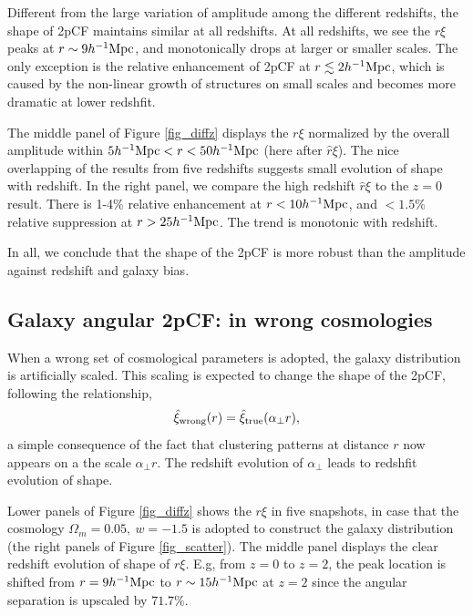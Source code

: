 \documentclass[iop]{emulateapj}
\begin{document}
Different from the large variation of amplitude among the different redshifts, %
the shape of 2pCF maintains similar at all redshifts. 
At all redshifts, we see the $r\xi$ peaks at $r\sim9 h^{-1}\rm Mpc$,
and monotonically drops at larger or smaller scales.
The only exception is the relative enhancement of 2pCF at $r\lesssim 2 h^{-1}\rm Mpc$,
which is caused by the non-linear growth of structures on small scales 
and becomes more dramatic at lower redshfit.

The middle panel of Figure \ref{fig_diffz} displays the $r\xi$ normalized by the overall amplitude within $5h^{-1}{\rm Mpc} < r < 50h^{-1}{\rm Mpc}$
(here after $\hat r\xi$).
The nice overlapping of the results from five redshifts 
suggests small evolution of shape with redshift.
In the right panel, we compare the high redshift $\hat r\xi$ 
to the $z=0$ result.
There is 1-4\% relative enhancement 
at $r<10h^{-1}\rm Mpc$,
and $<1.5\%$ relative suppression at $r>25 h^{-1}\rm Mpc$.
The trend is monotonic with redshift.

In all, we conclude that the shape of the 2pCF is more robust than the amplitude against redshift and galaxy bias.

\subsection{Galaxy angular 2pCF: in wrong cosmologies }

When a wrong set of cosmological parameters is adopted,
the galaxy distribution is artificially scaled.
This scaling is expected to change the shape of the 2pCF,
following the relationship,
\begin{equation}
 \hat \xi_{\rm wrong}(r) = \hat\xi_{\rm true}(\alpha_{\bot} r),
\end{equation}
a simple consequence of the fact that clustering patterns at distance $r$ now appears on a the scale $\alpha_{\bot} r$.
The redshift evolution of $\alpha_{\bot}$ leads to redshfit evolution of shape.


Lower panels of Figure \ref{fig_diffz} shows the $r\xi$ in five 
snapshots, in case that the cosmology $\Omega_m=0.05,\ w=-1.5$ 
is adopted to construct the galaxy distribution (the right panels of Figure \ref{fig_scatter}).
The middle panel displays the clear redshift evolution of shape of $r\xi$.
E.g, from $z=0$ to $z=2$,
the peak location is shifted from $r=9h^{-1} \rm Mpc$ to $r\sim15 h^{-1}\rm Mpc$ at $z=2$
since the angular separation is upscaled by $71.7\%$.
\end{document}

